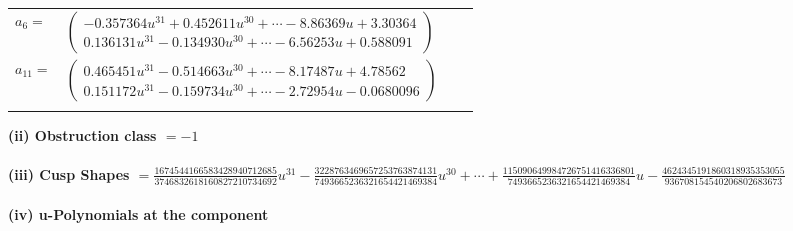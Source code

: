 \documentclass[1p]{elsarticle_modified}
\theoremstyle{definition}
\begin{document}
\begin{tabular}{m{7pt} m{180pt} m{7pt} m{180pt} }
\flushright $a_{6}=$&$\begin{pmatrix}-0.357364 u^{31}+0.452611 u^{30}+\cdots-8.86369 u+3.30364\\0.136131 u^{31}-0.134930 u^{30}+\cdots-6.56253 u+0.588091\end{pmatrix}$ \\
\flushright $a_{11}=$&$\begin{pmatrix}0.465451 u^{31}-0.514663 u^{30}+\cdots-8.17487 u+4.78562\\0.151172 u^{31}-0.159734 u^{30}+\cdots-2.72954 u-0.0680096\end{pmatrix}$\\&\end{tabular}
\flushleft \textbf{(ii) Obstruction class $= -1$}\\~\\
\flushleft \textbf{(iii) Cusp Shapes $= \frac{1674544166583428940712685}{3746832618160827210734692} u^{31}-\frac{3228763469657253763874131}{7493665236321654421469384} u^{30}+\cdots+\frac{115090649984726751416336801}{7493665236321654421469384} u-\frac{4624345191860318935353055}{936708154540206802683673}$}\\~\\
\newpage\renewcommand{\arraystretch}{1}
\flushleft \textbf{(iv) u-Polynomials at the component}\newline \\
\end{document}
